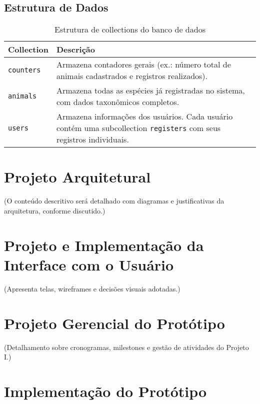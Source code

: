 \subsection{Estrutura de Dados}

\begin{table}[H]
    \centering
    \caption{Estrutura de collections do banco de dados}
    \label{tab:estrutura-dados}
    \begin{tabular}{|p{3cm}|p{10cm}|}
    \hline
    \textbf{Collection} & \textbf{Descrição} \\ \hline
    \texttt{counters} & Armazena contadores gerais (ex.: número total de animais cadastrados e registros realizados). \\ \hline
    \texttt{animals} & Armazena todas as espécies já registradas no sistema, com dados taxonômicos completos. \\ \hline
    \texttt{users} & Armazena informações dos usuários. Cada usuário contém uma subcollection \texttt{registers} com seus registros individuais. \\ \hline
    \end{tabular}
\end{table}
    

\section{Projeto Arquitetural}

(O conteúdo descritivo será detalhado com diagramas e justificativas da arquitetura, conforme discutido.)

\section{Projeto e Implementação da Interface com o Usuário}

(Apresenta telas, wireframes e decisões visuais adotadas.)

\section{Projeto Gerencial do Protótipo}

(Detalhamento sobre cronogramas, milestones e gestão de atividades do Projeto I.)

\section{Implementação do Protótipo}


